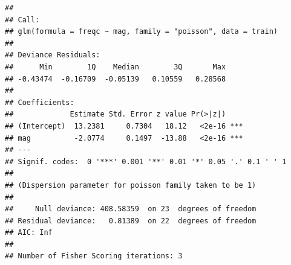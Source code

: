 \documentclass[
]{article}
\begin{document}
\begin{verbatim}
## 
## Call:
## glm(formula = freqc ~ mag, family = "poisson", data = train)
## 
## Deviance Residuals: 
##      Min        1Q    Median        3Q       Max  
## -0.43474  -0.16709  -0.05139   0.10559   0.28568  
## 
## Coefficients:
##             Estimate Std. Error z value Pr(>|z|)    
## (Intercept)  13.2381     0.7304   18.12   <2e-16 ***
## mag          -2.0774     0.1497  -13.88   <2e-16 ***
## ---
## Signif. codes:  0 '***' 0.001 '**' 0.01 '*' 0.05 '.' 0.1 ' ' 1
## 
## (Dispersion parameter for poisson family taken to be 1)
## 
##     Null deviance: 408.58359  on 23  degrees of freedom
## Residual deviance:   0.81389  on 22  degrees of freedom
## AIC: Inf
## 
## Number of Fisher Scoring iterations: 3
\end{verbatim}
\end{document}
